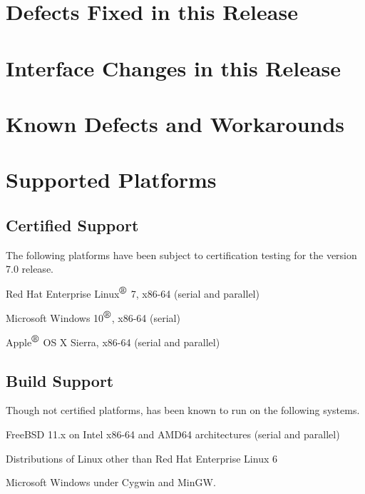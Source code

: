 \documentclass[letterpaper]{scrartcl}
\begin{document}
\newpage
\section{Defects Fixed in this Release}



\newpage
\section{Interface Changes in this Release}



\newpage
\section{Known Defects and Workarounds}



\newpage
\section{Supported Platforms}
\subsection*{Certified Support}
The following platforms have been subject to certification testing for the
\Xyce{} version 7.0 release.
\begin{XyceItemize}
  \item Red Hat Enterprise Linux${}^{\mbox{\textregistered}}$ 7, x86-64 (serial and parallel)
  \item Microsoft Windows 10${}^{\mbox{\textregistered}}$, x86-64 (serial)
  \item Apple${}^{\mbox{\textregistered}}$ OS X Sierra, x86-64 (serial and parallel)
\end{XyceItemize}

\subsection*{Build Support}
Though not certified platforms, \Xyce{} has been known to run on the following
systems.
\begin{XyceItemize}
  \item FreeBSD 11.x on Intel x86-64 and AMD64 architectures (serial
    and parallel)
  \item Distributions of Linux other than Red Hat Enterprise Linux 6
  \item Microsoft Windows under Cygwin and MinGW.
\end{XyceItemize}
\end{document}
